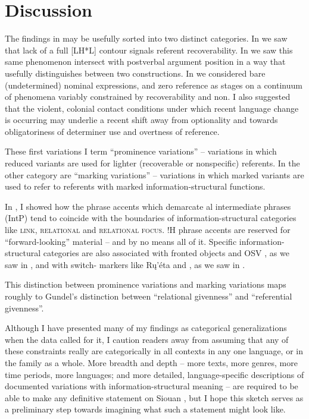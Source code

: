 \documentclass[output=paper]{LSP/langsci}
\begin{document}
\section{Discussion}\label{discussion}

The findings in  may be usefully sorted into two distinct categories. In  we saw that lack of a full [LH*L] contour signals referent recoverability. In  we saw this same phenomenon intersect with postverbal argument position in a way that usefully distinguishes between two constructions. In  we considered bare (undetermined) nominal expressions,  and zero reference as stages on a continuum of phenomena variably constrained by recoverability and non. I also suggested that the violent, colonial contact conditions under which recent language change is occurring may underlie a recent shift away from optionality and towards obligatoriness of determiner use and overtness of reference. 

These first variations I term “prominence variations” -- variations in which reduced variants are used for lighter (recoverable or nonspecific) referents. In the other category are “marking variations” -- variations in which marked variants are used to refer to referents with marked information-structural functions. 

In , I showed how the phrase accents which demarcate al intermediate phrases (IntP) tend to coincide with the boundaries of information-structural categories like \textsc{link, relational } and \textsc{relational focus}. !H phrase accents are reserved for “forward-looking” material -- and by no means all of it. Specific information-structural categories are also associated with fronted objects and OSV , as we saw in , and with switch- markers like Rų’éta  and  , as we saw in .

This distinction between prominence variations and marking variations maps roughly to Gundel’s \citeyearpar{Gundel2003, Gundel1988} distinction between “relational givenness” and  “referential givenness”.

Although I have presented many of my findings as categorical generalizations when the data called for it, I caution readers away from assuming that any of these constraints really are categorically  in all contexts in any one language, or in the family as a whole. More breadth and depth -- more texts, more genres, more time periods, more languages; and more detailed, language-specific descriptions of documented variations with information-structural meaning -- are required to be able to make any definitive statement on Siouan , but I hope this sketch serves as a preliminary step towards imagining what such a statement might look like.
\end{document}
